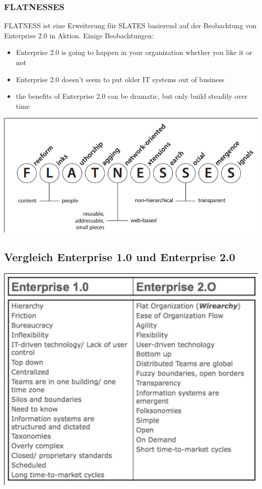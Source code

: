 \documentclass{article} %
\begin{document}
	\subsubsection{FLATNESSES}
	FLATNESS ist eine Erweiterung für SLATES basierend auf der Beobachtung von Enterprise 2.0 in Aktion. Einige Beobachtungen:
	\begin{itemize}
		\item Enterprise 2.0 is going to happen in your organization whether you
		like it or not
		\item Enterprise 2.0 doesn’t seem to put older IT systems out of business
		\item the benefits of Enterprise 2.0 can be dramatic, but only build steadily
		over time
	\end{itemize}
	\begin{center}
		\includegraphics[scale=0.5]{img/FLATNESS.jpg}
	\end{center}
	\subsection{Vergleich Enterprise 1.0 und Enterprise 2.0}
	\begin{center}
		\includegraphics[scale=0.8]{img/CompareW1W2.jpg}
	\end{center}
\end{document}
